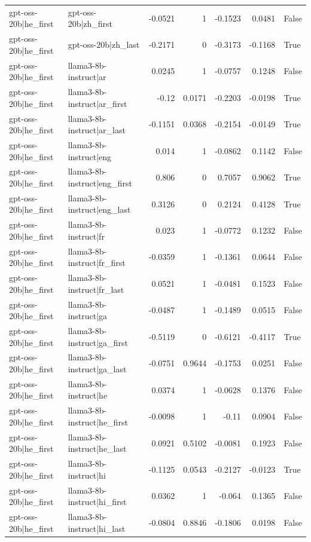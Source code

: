 \begin{table}
\begin{tabular}{l l r r r r l}
gpt-oss-20b|he_first & gpt-oss-20b|zh_first & -0.0521 & 1 & -0.1523 & 0.0481 & False \\
gpt-oss-20b|he_first & gpt-oss-20b|zh_last & -0.2171 & 0 & -0.3173 & -0.1168 & True \\
gpt-oss-20b|he_first & llama3-8b-instruct|ar & 0.0245 & 1 & -0.0757 & 0.1248 & False \\
gpt-oss-20b|he_first & llama3-8b-instruct|ar_first & -0.12 & 0.0171 & -0.2203 & -0.0198 & True \\
gpt-oss-20b|he_first & llama3-8b-instruct|ar_last & -0.1151 & 0.0368 & -0.2154 & -0.0149 & True \\
gpt-oss-20b|he_first & llama3-8b-instruct|eng & 0.014 & 1 & -0.0862 & 0.1142 & False \\
gpt-oss-20b|he_first & llama3-8b-instruct|eng_first & 0.806 & 0 & 0.7057 & 0.9062 & True \\
gpt-oss-20b|he_first & llama3-8b-instruct|eng_last & 0.3126 & 0 & 0.2124 & 0.4128 & True \\
gpt-oss-20b|he_first & llama3-8b-instruct|fr & 0.023 & 1 & -0.0772 & 0.1232 & False \\
gpt-oss-20b|he_first & llama3-8b-instruct|fr_first & -0.0359 & 1 & -0.1361 & 0.0644 & False \\
gpt-oss-20b|he_first & llama3-8b-instruct|fr_last & 0.0521 & 1 & -0.0481 & 0.1523 & False \\
gpt-oss-20b|he_first & llama3-8b-instruct|ga & -0.0487 & 1 & -0.1489 & 0.0515 & False \\
gpt-oss-20b|he_first & llama3-8b-instruct|ga_first & -0.5119 & 0 & -0.6121 & -0.4117 & True \\
gpt-oss-20b|he_first & llama3-8b-instruct|ga_last & -0.0751 & 0.9644 & -0.1753 & 0.0251 & False \\
gpt-oss-20b|he_first & llama3-8b-instruct|he & 0.0374 & 1 & -0.0628 & 0.1376 & False \\
gpt-oss-20b|he_first & llama3-8b-instruct|he_first & -0.0098 & 1 & -0.11 & 0.0904 & False \\
gpt-oss-20b|he_first & llama3-8b-instruct|he_last & 0.0921 & 0.5102 & -0.0081 & 0.1923 & False \\
gpt-oss-20b|he_first & llama3-8b-instruct|hi & -0.1125 & 0.0543 & -0.2127 & -0.0123 & True \\
gpt-oss-20b|he_first & llama3-8b-instruct|hi_first & 0.0362 & 1 & -0.064 & 0.1365 & False \\
gpt-oss-20b|he_first & llama3-8b-instruct|hi_last & -0.0804 & 0.8846 & -0.1806 & 0.0198 & False \\

\end{tabular}
\end{table}

